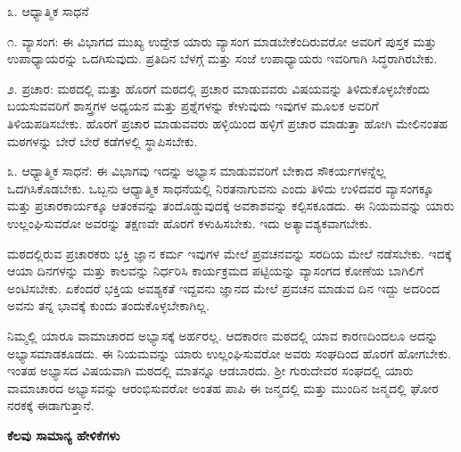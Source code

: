 \vspace{0.13cm}

೩. ಆಧ್ಯಾತ್ಮಿಕ ಸಾಧನೆ

\vspace{0.15cm}

೧. ವ್ಯಾಸಂಗ: ಈ ವಿಭಾಗದ ಮುಖ್ಯ ಉದ್ದೇಶ ಯಾರು ವ್ಯಾಸಂಗ ಮಾಡಬೇಕೆಂದಿರುವರೋ ಅವರಿಗೆ ಪುಸ್ತಕ ಮತ್ತು ಉಪಾಧ್ಯಾಯರನ್ನು ಒದಗಿಸುವುದು. ಪ್ರತಿದಿನ ಬೆಳಗ್ಗೆ ಮತ್ತು ಸಂಜೆ ಉಪಾಧ್ಯಾಯರು ಇವರಿಗಾಗಿ ಸಿದ್ಧರಾಗಿರಬೇಕು.

\vspace{0.15cm}

೨. ಪ್ರಚಾರ: ಮಠದಲ್ಲಿ ಮತ್ತು ಹೊರಗೆ\enginline{-} ಮಠದಲ್ಲಿ ಪ್ರಚಾರ ಮಾಡುವವರು ವಿಷಯವನ್ನು ತಿಳಿದುಕೊಳ್ಳಬೇಕೆಂದು ಬಯಸುವವರಿಗೆ ಶಾಸ್ತ್ರಗಳ ಅಧ್ಯಯನ ಮತ್ತು ಪ್ರಶ್ನೆಗಳನ್ನು ಕೇಳುವುದು ಇವುಗಳ ಮೂಲಕ ಅವರಿಗೆ ತಿಳಿಯಪಡಿಸಬೇಕು. ಹೊರಗೆ ಪ್ರಚಾರ ಮಾಡುವವರು ಹಳ್ಳಿಯಿಂದ ಹಳ್ಳಿಗೆ ಪ್ರಚಾರ ಮಾಡುತ್ತಾ ಹೋಗಿ ಮೇಲಿನಂತಹ ಮಠಗಳನ್ನು ಬೇರೆ ಬೇರೆ ಕಡೆಗಳಲ್ಲಿ ಸ್ಥಾಪಿಸಬೇಕು.

\vspace{0.15cm}

೩. ಆಧ್ಯಾತ್ಮಿಕ ಸಾಧನೆ: ಈ ವಿಭಾಗವು ಇದನ್ನು ಅಭ್ಯಾಸ ಮಾಡುವವರಿಗೆ ಬೇಕಾದ ಸೌಕರ್ಯಗಳನ್ನೆಲ್ಲ ಒದಗಿಸಿಕೊಡಬೇಕು. ಒಬ್ಬನು ಆಧ್ಯಾತ್ಮಿಕ ಸಾಧನೆಯಲ್ಲಿ ನಿರತನಾಗುವನು ಎಂದು ತಿಳಿದು ಉಳಿದವರ ವ್ಯಾಸಂಗಕ್ಕೂ ಮತ್ತು ಪ್ರಚಾರಕಾರ್ಯಕ್ಕೂ ಆತಂಕವನ್ನು ತಂದೊಡ್ಡುವುದಕ್ಕೆ ಅವಕಾಶವನ್ನು ಕಲ್ಪಿಸಕೂಡದು. ಈ ನಿಯಮವನ್ನು ಯಾರು ಉಲ್ಲಂಘಿಸುವರೋ ಅವರನ್ನು ತಕ್ಷಣವೇ ಹೊರಗೆ ಕಳುಹಿಸಬೇಕು. ಇದು ಅತ್ಯಾವಶ್ಯಕವಾಗಬೇಕು.

\vspace{0.15cm}

ಮಠದಲ್ಲಿರುವ ಪ್ರಚಾರಕರು ಭಕ್ತಿ ಜ್ಞಾನ ಕರ್ಮ ಇವುಗಳ ಮೇಲೆ ಪ್ರವಚನವನ್ನು ಸರದಿಯ ಮೇಲೆ ನಡೆಸಬೇಕು. ಇದಕ್ಕೆ ಆಯಾ ದಿನಗಳನ್ನು ಮತ್ತು ಕಾಲವನ್ನು ನಿರ್ಧರಿಸಿ ಕಾರ್ಯಕ್ರಮದ ಪಟ್ಟಿಯನ್ನು ವ್ಯಾಸಂಗದ ಕೋಣೆಯ ಬಾಗಿಲಿಗೆ ಅಂಟಿಸಬೇಕು. ಏಕೆಂದರೆ ಭಕ್ತಿಯ ಅವಶ್ಯಕತೆ ಇದ್ದವನು ಜ್ಞಾನದ ಮೇಲೆ ಪ್ರವಚನ ಮಾಡುವ ದಿನ ಇದ್ದು ಅದರಿಂದ ಅವನು ತನ್ನ ಭಾವಕ್ಕೆ ಕುಂದು ತಂದುಕೊಳ್ಳಬೇಕಾಗಿಲ್ಲ.

\vspace{0.15cm}

ನಿಮ್ಮಲ್ಲಿ ಯಾರೂ ವಾಮಾಚಾರದ ಅಭ್ಯಾಸಕ್ಕೆ ಅರ್ಹರಲ್ಲ. ಆದಕಾರಣ ಮಠದಲ್ಲಿ ಯಾವ ಕಾರಣದಿಂದಲೂ ಅದನ್ನು ಅಭ್ಯಾಸಮಾಡಕೂಡದು. ಈ ನಿಯಮವನ್ನು ಯಾರು ಉಲ್ಲಂಘಿಸುವರೋ ಅವರು ಸಂಘದಿಂದ ಹೊರಗೆ ಹೋಗಬೇಕು. ಇಂತಹ ಅಭ್ಯಾಸದ ವಿಷಯವಾಗಿ ಮಠದಲ್ಲಿ ಮಾತನ್ನೂ ಆಡಬಾರದು. ಶ‍್ರೀ ಗುರುದೇವರ ಸಂಘದಲ್ಲಿ ಯಾರು ವಾಮಾಚಾರದ ಅಭ್ಯಾಸವನ್ನು ಆರಂಭಿಸುವರೋ ಅಂತಹ ಪಾಪಿ ಈ ಜನ್ಮದಲ್ಲಿ ಮತ್ತು ಮುಂದಿನ ಜನ್ಮದಲ್ಲಿ ಘೋರ ನರಕಕ್ಕೆ ಈಡಾಗುತ್ತಾನೆ.

\vspace{0.15cm}

\begin{center}
\textbf{ಕೆಲವು ಸಾಮಾನ್ಯ ಹೇಳಿಕೆಗಳು}
\end{center}

\vspace{0.15cm}


